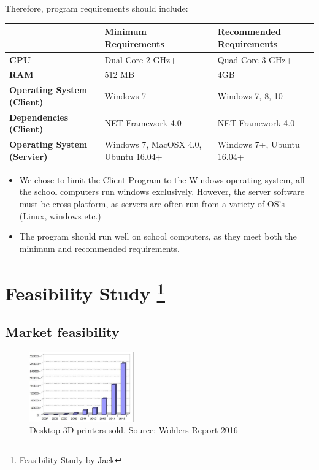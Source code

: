 \documentclass[oneside,openany,11pt,a4paper]{report}
\begin{document}
Therefore, program requirements should include: \\
\begin{longtable}{|p{4cm}|p{4cm}|p{4cm}|}	
	\hline
	\rowcolor{gray!25}
	& \textbf{Minimum Requirements}  & \textbf{Recommended Requirements} \\ \hline
	
	\rowcolor{gray!25}
	\textbf{CPU} &  Dual Core 2 GHz+ &  Quad Core 3 GHz+ \\ \hline
	
	\rowcolor{white}
	\textbf{RAM} &  512 MB &  4GB \\ \hline
	
	\rowcolor{gray!25}
	\textbf{Operating System (Client)} &  Windows 7 &  Windows 7, 8, 10 \\ \hline
	
	\rowcolor{white}
	\textbf{Dependencies (Client)} &  NET Framework 4.0 &  NET Framework 4.0 \\ \hline
	
	\rowcolor{gray!25}
	\textbf{Operating System (Servier)} &  Windows 7, MacOSX 4.0, Ubuntu 16.04+ &  Windows 7+, Ubuntu 16.04+ \\ \hline
	
	
\end{longtable}

\begin{itemize}
	\itemsep0em
	\item We chose to limit the Client Program to the Windows operating system, all the school computers run windows exclusively. However, the server software must be cross platform, as servers are often run from a variety of OS’s (Linux, windows etc.)
	\item The program should run well on school computers, as they meet both the minimum and recommended requirements.
\end{itemize} 

\section[Feasibility Study]{Feasibility Study \footnote{Feasibility Study by Jack}}
\subsection{Market feasibility}
\begin{figure} \centering \includegraphics[width=0.4\textwidth]{wrap1.png} \caption{\label{fig:Diagram} Desktop 3D printers sold. Source: Wohlers Report 2016}\end{figure} 
\end{document}
